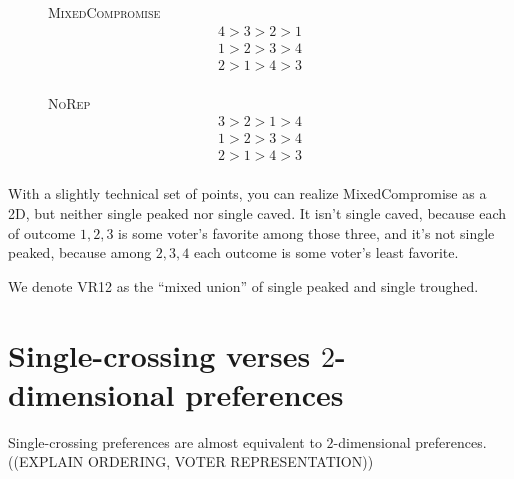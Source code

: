 \documentclass[12pt]{article}
\newcommand{\1}[1]{\mathds{1}[{#1}]}
\begin{document}
  \begin{figure}[H]
    \begin{minipage}{0.15\textwidth}
      \centering
      {\textsc{MixedCompromise}}
      \begin{align*}
        4 > 3 > 2 > 1 \\
        1 > 2 > 3 > 4 \\
        2 > 1 > 4 > 3 \\
      \end{align*}
    \end{minipage}\hfill
    \begin{minipage}{0.15\textwidth}
      {\textsc{NoRep}}
      \begin{align*}
        3 > 2 > 1 > 4 \\
        1 > 2 > 3 > 4 \\
        2 > 1 > 4 > 3 \\
      \end{align*}
      \centering
    \end{minipage}\hfill
    \begin{minipage}{0.15\textwidth}
      \centering
    \end{minipage}\hfill
  \end{figure}

  With a slightly technical set of points, you can realize
  {\sc MixedCompromise} as a 2D, but neither single peaked nor single caved.
  It isn't single caved, because each of outcome $1,2,3$ is some voter's
  favorite among those three, and it's not single peaked, because among $2,3,4$
  each outcome is some voter's least favorite.

  We denote VR12 as the ``mixed union'' of single peaked and single troughed.

\section{Single-crossing verses $2$-dimensional preferences}
  \label{sec:crossVsTwoD}

  Single-crossing preferences are almost equivalent to $2$-dimensional
  preferences. ((EXPLAIN ORDERING, VOTER REPRESENTATION))
\end{document}
